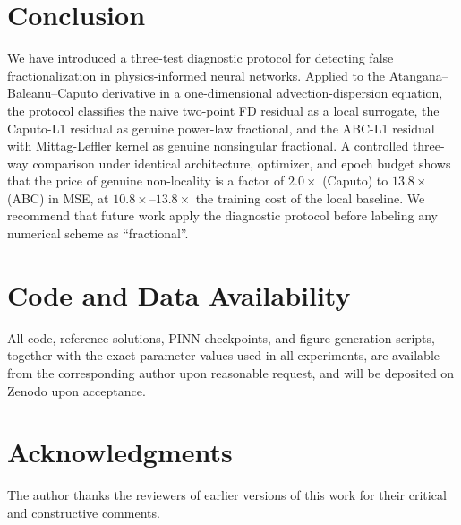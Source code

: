 \documentclass[11pt]{article}
\begin{document}
\section{Conclusion}
\label{sec:conclusion}

We have introduced a three-test diagnostic protocol for detecting false fractionalization in physics-informed neural networks. Applied to the Atangana--Baleanu--Caputo derivative in a one-dimensional advection-dispersion equation, the protocol classifies the naive two-point FD residual as a local surrogate, the Caputo-L1 residual as genuine power-law fractional, and the ABC-L1 residual with Mittag-Leffler kernel as genuine nonsingular fractional. A controlled three-way comparison under identical architecture, optimizer, and epoch budget shows that the price of genuine non-locality is a factor of \(2.0\times\) (Caputo) to \(13.8\times\) (ABC) in MSE, at \(10.8\times\)--\(13.8\times\) the training cost of the local baseline. We recommend that future work apply the diagnostic protocol before labeling any numerical scheme as ``fractional''.

\section*{Code and Data Availability}
\label{sec:code}
All code, reference solutions, PINN checkpoints, and figure-generation scripts, together with the exact parameter values used in all experiments, are available from the corresponding author upon reasonable request, and will be deposited on Zenodo upon acceptance.

\section*{Acknowledgments}
The author thanks the reviewers of earlier versions of this work for their critical and constructive comments.
\end{document}

